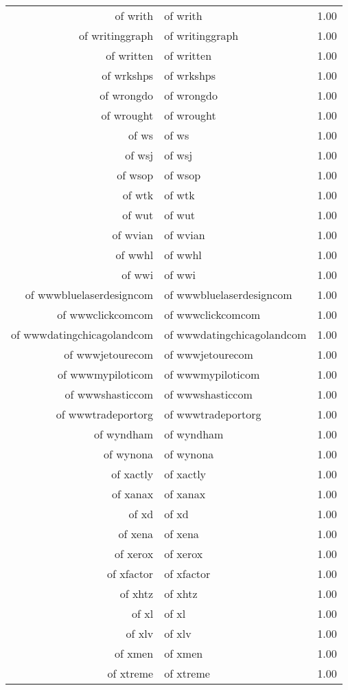 \begin{table}[ht]
\begin{tabular}{rlr}
  of writh & of writh & 1.00 \\ 
  of writinggraph & of writinggraph & 1.00 \\ 
  of written & of written & 1.00 \\ 
  of wrkshps & of wrkshps & 1.00 \\ 
  of wrongdo & of wrongdo & 1.00 \\ 
  of wrought & of wrought & 1.00 \\ 
  of ws & of ws & 1.00 \\ 
  of wsj & of wsj & 1.00 \\ 
  of wsop & of wsop & 1.00 \\ 
  of wtk & of wtk & 1.00 \\ 
  of wut & of wut & 1.00 \\ 
  of wvian & of wvian & 1.00 \\ 
  of wwhl & of wwhl & 1.00 \\ 
  of wwi & of wwi & 1.00 \\ 
  of wwwbluelaserdesigncom & of wwwbluelaserdesigncom & 1.00 \\ 
  of wwwclickcomcom & of wwwclickcomcom & 1.00 \\ 
  of wwwdatingchicagolandcom & of wwwdatingchicagolandcom & 1.00 \\ 
  of wwwjetourecom & of wwwjetourecom & 1.00 \\ 
  of wwwmypiloticom & of wwwmypiloticom & 1.00 \\ 
  of wwwshasticcom & of wwwshasticcom & 1.00 \\ 
  of wwwtradeportorg & of wwwtradeportorg & 1.00 \\ 
  of wyndham & of wyndham & 1.00 \\ 
  of wynona & of wynona & 1.00 \\ 
  of xactly & of xactly & 1.00 \\ 
  of xanax & of xanax & 1.00 \\ 
  of xd & of xd & 1.00 \\ 
  of xena & of xena & 1.00 \\ 
  of xerox & of xerox & 1.00 \\ 
  of xfactor & of xfactor & 1.00 \\ 
  of xhtz & of xhtz & 1.00 \\ 
  of xl & of xl & 1.00 \\ 
  of xlv & of xlv & 1.00 \\ 
  of xmen & of xmen & 1.00 \\ 
  of xtreme & of xtreme & 1.00 \\ 

\end{tabular}
\end{table}
